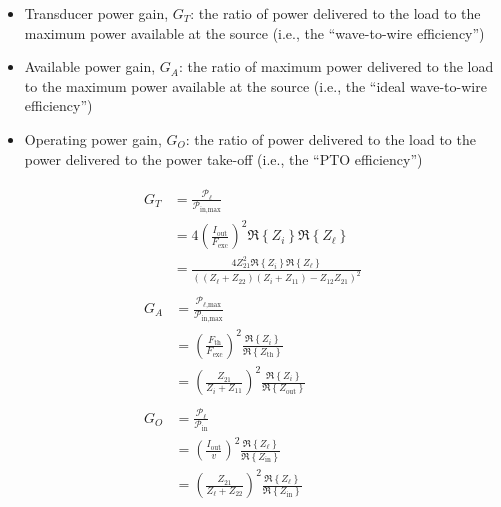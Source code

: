 \documentclass[lettersize,journal]{IEEEtran}
\begin{document}
\begin{itemize}
        \item Transducer power gain, $G_T$: the ratio of power delivered to the load to the maximum power available at the source (i.e., the ``wave-to-wire efficiency'')
        \item Available power gain, $G_A$: the ratio of maximum power delivered to the load to the maximum power available at the source (i.e., the ``ideal wave-to-wire efficiency'')
        \item Operating power gain, $G_O$: the ratio of power delivered to the load to the power delivered to the power take-off (i.e., the ``PTO efficiency'')
\end{itemize}
%
\begin{subequations}
\begin{align}
        \begin{split}
                G_T &= \frac{\mathcal{P}_\ell}{\mathcal{P}_{\textrm{in,max}}} \\
                &= 4\left(\frac{I_{\textrm{out}}}{F_{\textrm{exc}}}\right)^2\Re \left\{ Z_i \right\}\Re \left\{ Z_{\ell} \right\}  \\
                &= \frac{4 Z_{21}^2 \Re \left\{ Z_i \right\}\Re \left\{ Z_{\ell} \right\}}{((Z_{\ell} + Z_{22})(Z_i + Z_{11}) - Z_{12}Z_{21})^2} 
        \end{split}
        \label{eq:transducer_gain}
        \\[1em]
        \begin{split}
                G_A &= \frac{\mathcal{P}_{\ell\textrm{,max}}}{\mathcal{P}_{\textrm{in,max}}}  \\
                &= \left(\frac{F_{\textrm{th}}}{F_{\textrm{exc}}}\right)^2\frac{\Re \left\{ Z_i \right\}}{\Re \left\{ Z_{\textrm{th}} \right\}} \\
                &= \left(\frac{Z_{21}}{Z_i + Z_{11}}\right)^2\frac{\Re \left\{ Z_i \right\}}{\Re \left\{ Z_{\textrm{out}} \right\}}
        \end{split}
        \label{eq:available_gain}
        \\[1em]
        \begin{split}
                G_O &= \frac{\mathcal{P}_\ell}{\mathcal{P}_{\textrm{in}}}  \\
                &= \left(\frac{I_{\textrm{out}}}{v}\right)^2\frac{\Re \left\{ Z_{\ell} \right\}}{\Re \left\{ Z_{\textrm{in}} \right\}} \\
                &=  \left(\frac{Z_{21}}{Z_{\ell} + Z_{22}}\right)^2\frac{\Re \left\{ Z_{\ell} \right\}}{\Re \left\{ Z_{\textrm{in}} \right\}} 
        \end{split} \label{eq:operating_gain}
\end{align} \label{eq:gains}
\end{subequations}
\end{document}
